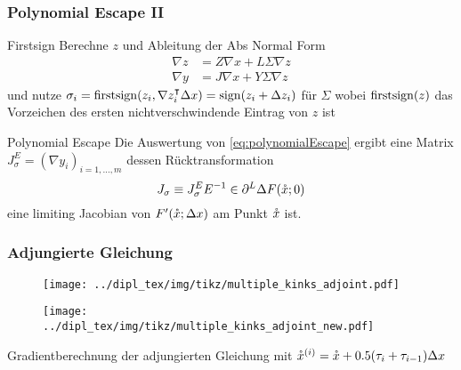 \begin{frame}[<+->]
\frametitle{Polynomial Escape II}
\vspace*{-0.1cm} 
\begin{block}{Firstsign}
 Berechne $z$ und Ableitung der Abs Normal Form
 \vspace*{-0.3cm}
 \begin{equation}\label{eq:polynomialEscape}
 \begin{aligned}
  \nabla z &= Z \nabla x + L \Sigma \nabla z\\
  \nabla y &= J\nabla x + Y\Sigma \nabla z
 \end{aligned}
 \end{equation}
 und nutze $
       \sigma_i = \operatorname{firstsign}(z_i,\nabla z_i^\intercal \Delta x) =\operatorname{sign} (z_i + \Delta z_i)
      $ für $\Sigma$
wobei $\operatorname{firstsign}(z)$ das Vorzeichen des ersten nichtverschwindende Eintrag von $z$ ist
\end{block}
\vspace*{-0.1cm} 
\begin{block}{Polynomial Escape \cite[Prop. 8]{monster}}
Die Auswertung von \eqref{eq:polynomialEscape} ergibt eine Matrix $J_\sigma^E = (\nabla y_{i})_{i=1,\ldots,m}$ dessen Rücktransformation
\[
 J_\sigma\equiv J_\sigma^E E^{-1} \in \partial^L \Delta F(\mathring{x};0)
\]
eine limiting Jacobian von $F'(\mathring{x};\Delta x)$ am Punkt $\mathring{x}$ ist.
\end{block}

\end{frame}


\begin{frame}[<+->]
\frametitle{Adjungierte Gleichung}
\begin{figure}
\centering
\texttt{[image: ../dipl\_tex/img/tikz/multiple\_kinks\_adjoint.pdf]}
\end{figure}
\begin{figure}
\centering
\texttt{[image: ../dipl\_tex/img/tikz/multiple\_kinks\_adjoint\_new.pdf]}
\end{figure}
\centering
Gradientberechnung der adjungierten Gleichung mit $\mathring{x}^{(i)} = \mathring{x} + 0.5(\tau_i+\tau_{i-1})\Delta x$
\end{frame}

